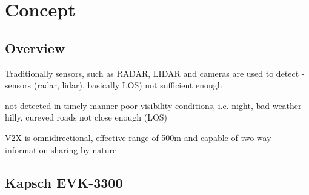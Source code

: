 \chapter{Concept}
\label{cha:Concept}

\section{Overview}
Traditionally sensors, such as RADAR, LIDAR and cameras are used to detect 
- sensors (radar, lidar), basically LOS) not sufficient enough

not detected in timely manner
poor visibility conditions, i.e. night, bad weather
hilly, cureved roads
not close enough (LOS)

V2X is omnidirectional, effective range of 500m and capable of two-way-information sharing by nature


\section{Kapsch EVK-3300}